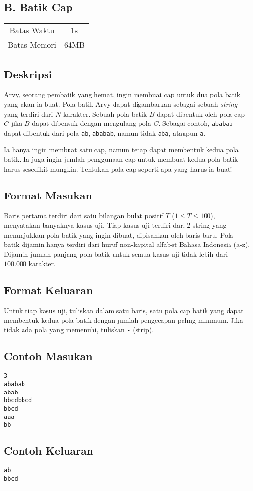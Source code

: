 \documentclass{article}
\begin{document}
\begin{center}
    \section*{B. Batik Cap} %
    \begin{tabular}{ | c c | }
        \hline
        Batas Waktu  & 1s \\    %
        Batas Memori & 64MB \\  %
        \hline
    \end{tabular}
\end{center}

\subsection*{Deskripsi}
Arvy, seorang pembatik yang hemat, ingin membuat cap untuk dua pola batik yang akan ia buat.
Pola batik Arvy dapat digambarkan sebagai sebuah \textit{string} yang terdiri dari $N$ karakter.
Sebuah pola batik $B$ dapat dibentuk oleh pola cap $C$ jika $B$ dapat dibentuk dengan mengulang pola $C$.
Sebagai contoh, \lstinline{ababab} dapat dibentuk dari pola \lstinline{ab}, \lstinline{ababab}, namun tidak \lstinline{aba}, ataupun \lstinline{a}.

Ia hanya ingin membuat satu cap, namun tetap dapat membentuk kedua pola batik.
Ia juga ingin jumlah penggunaan cap untuk membuat kedua pola batik harus sesedikit mungkin.
Tentukan pola cap seperti apa yang harus ia buat!

\subsection*{Format Masukan}
Baris pertama terdiri dari satu bilangan bulat positif $T$ ($1 \leq T \leq 100$), menyatakan banyaknya kasus uji.
Tiap kasus uji terdiri dari 2 string yang menunjukkan pola batik yang ingin dibuat, dipisahkan oleh baris baru.
Pola batik dijamin hanya terdiri dari huruf non-kapital alfabet Bahasa Indonesia (a-z).
Dijamin jumlah panjang pola batik untuk semua kasus uji tidak lebih dari $100.000$ karakter.

\subsection*{Format Keluaran}
Untuk tiap kasus uji, tuliskan dalam satu baris, satu pola cap batik yang dapat membentuk kedua pola batik dengan jumlah pengecapan paling minimum.
Jika tidak ada pola yang memenuhi, tuliskan \lstinline{-} (strip).
\\

\begin{multicols}{2}
\subsection*{Contoh Masukan}
\begin{lstlisting}
3
ababab
abab
bbcdbbcd
bbcd
aaa
bb
\end{lstlisting}
\columnbreak
\subsection*{Contoh Keluaran}
\begin{lstlisting}
ab
bbcd
-
\end{lstlisting}
\vfill
\null
\end{multicols}

\pagebreak
\end{document}
